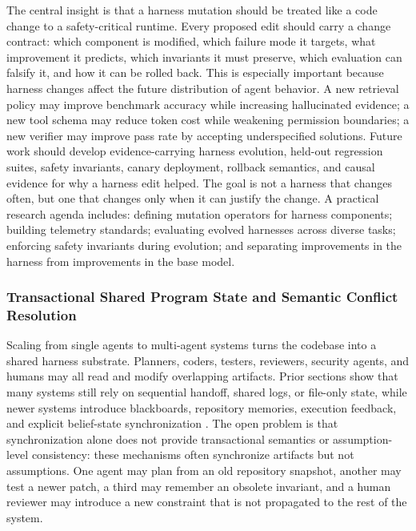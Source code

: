 \documentclass{llmxive}
\begin{document}
The central insight is that a harness mutation should be treated like a code change to a safety-critical runtime. Every proposed edit should carry a change contract: which component is modified, which failure mode it targets, what improvement it predicts, which invariants it must preserve, which evaluation can falsify it, and how it can be rolled back. This is especially important because harness changes affect the future distribution of agent behavior. A new retrieval policy may improve benchmark accuracy while increasing hallucinated evidence; a new tool schema may reduce token cost while weakening permission boundaries; a new verifier may improve pass rate by accepting underspecified solutions. Future work should develop evidence-carrying harness evolution, held-out regression suites, safety invariants, canary deployment, rollback semantics, and causal evidence for why a harness edit helped. The goal is not a harness that changes often, but one that changes only when it can justify the change. A practical research agenda includes: defining mutation operators for harness components; building telemetry standards; evaluating evolved harnesses across diverse tasks; enforcing safety invariants during evolution; and separating improvements in the harness from improvements in the base model.


\subsubsection{Transactional Shared Program State and Semantic Conflict Resolution}

Scaling from single agents to multi-agent systems turns the codebase into a shared harness substrate. Planners, coders, testers, reviewers, security agents, and humans may all read and modify overlapping artifacts. Prior sections show that many systems still rely on sequential handoff, shared logs, or file-only state, while newer systems introduce blackboards, repository memories, execution feedback, and explicit belief-state synchronization \citep{Qian2023ChatDev,Hong2023MetaGPT,huang2023agentcoder,wang2025openhands,Guo2025SyncMind}. The open problem is that synchronization alone does not provide transactional semantics or assumption-level consistency: these mechanisms often synchronize artifacts but not assumptions. One agent may plan from an old repository snapshot, another may test a newer patch, a third may remember an obsolete invariant, and a human reviewer may introduce a new constraint that is not propagated to the rest of the system.
\end{document}

